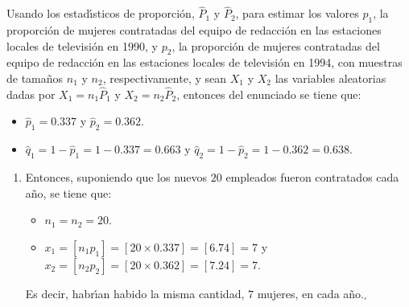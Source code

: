 \begin{solucion}
 Usando los estad\'{\i}sticos de proporci\'on, $\widehat{P}_1$ y $\widehat{P}_2$, para estimar los valores $p_1$, la proporci\'on de mujeres contratadas del equipo de redacci\'on en las estaciones locales de televisi\'on en 1990, y $p_2$, la proporci\'on de mujeres contratadas del equipo de redacci\'on en las estaciones locales de televisi\'on en 1994, con muestras de tama\~nos $n_1$ y $n_2$, respectivamente, y sean $X_1$ y $X_2$ las variables aleatorias dadas por $X_1 = n_1\widehat{P}_1$ y $X_2 = n_2\widehat{P}_2$, entonces del enunciado se tiene que:
 \begin{itemize}
  \item $\hat{p}_1 = 0.337$ y $\hat{p}_2 = 0.362$.
  \item $\hat{q}_1 = 1 - \hat{p}_1 = 1 - 0.337 = 0.663$ y $\hat{q}_2 = 1 - \hat{p}_2 = 1 - 0.362 = 0.638$.
 \end{itemize}
 \begin{enumerate}
  \item Entonces, suponiendo que los nuevos $20$ empleados fueron contratados cada año, se tiene que:
  \begin{itemize}
   \item $n_1 = n_2 = 20$.
   \item $x_1 =  \left[ n_1p_1 \right] = \left[ 20\times 0.337 \right] = [6.74] = 7$ y $x_2 = \left[ n_2p_2 \right] = \left[ 20\times 0.362 \right] = [7.24] = 7$.
  \end{itemize}
  Es decir, habr\'{\i}an habido la misma cantidad, $7$ mujeres, en cada a\~no.${}_{\square}$
  

\end{enumerate}
\end{solucion}
